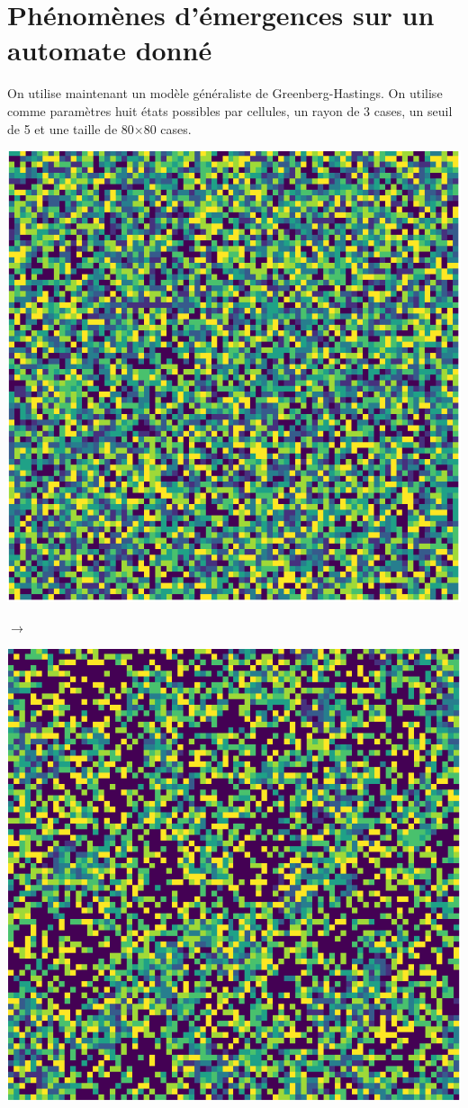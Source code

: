 \documentclass[12pt, a4paper]{article}
\begin{document}
    \section{Phénomènes d'émergences sur un automate donné}
        On utilise maintenant un modèle généraliste de Greenberg-Hastings. On utilise comme paramètres huit états possibles par cellules, un rayon de 3 cases, un seuil de 5 et une taille de 80$\times$80 cases.
        \begin{center}
            \begin{minipage}{.17\linewidth}
                \includegraphics[scale=0.15]{img/part2/step1.png}
            \end{minipage}
            $\rightarrow$
            \begin{minipage}{.17\linewidth}
                \includegraphics[scale=0.15]{img/part2/step2.png}

\end{minipage}
\end{center}
\end{document}

